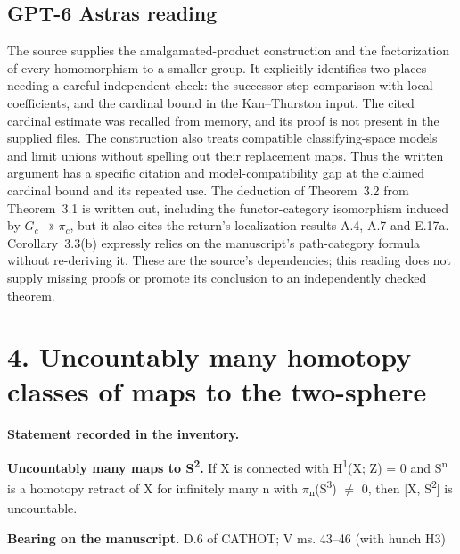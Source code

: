 \subsection*{GPT-6 Astra\textquotesingle s reading}

The source supplies the amalgamated-product construction and the factorization of every homomorphism to a smaller group. It explicitly identifies two places needing a careful independent check: the successor-step comparison with local coefficients, and the cardinal bound in the Kan--Thurston input. The cited cardinal estimate was recalled from memory, and its proof is not present in the supplied files. The construction also treats compatible classifying-space models and limit unions without spelling out their replacement maps. Thus the written argument has a specific citation and model-compatibility gap at the claimed cardinal bound and its repeated use. The deduction of Theorem~3.2 from Theorem~3.1 is written out, including the functor-category isomorphism induced by $G_c\twoheadrightarrow\pi_c$, but it also cites the return's localization results A.4, A.7 and E.17a. Corollary~3.3(b) expressly relies on the manuscript's path-category formula without re-deriving it. These are the source's dependencies; this reading does not supply missing proofs or promote its conclusion to an independently checked theorem.

\par\bigskip

\section*{4. Uncountably many homotopy classes of maps to the two-sphere}


\label{nr:entry4}

\noindent\textbf{Statement recorded in the inventory.}\par\smallskip

\textbf{Uncountably many maps to S\textsuperscript{2}.} If X is connected with H\textsuperscript{1}(X; Z) = 0 and S\textsuperscript{n} is a homotopy retract of X for infinitely many n with \ensuremath{\pi}\textsubscript{n}(S\textsuperscript{3}) \ensuremath{\ne} 0, then [X, S\textsuperscript{2}] is uncountable.


\noindent\textbf{Bearing on the manuscript.} D.6 of CATHOT; V ms. 43--46 (with hunch H3)\par\smallskip

